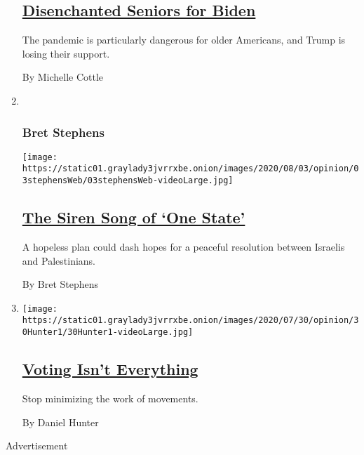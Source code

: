 \begin{enumerate}
  \hypertarget{disenchanted-seniors-for-biden}{%
  \subsection{\texorpdfstring{\href{/2020/08/03/opinion/senior-voters-biden-trump-2020.html}{Disenchanted
  Seniors for
  Biden}}{Disenchanted Seniors for Biden}}\label{disenchanted-seniors-for-biden}}

  The pandemic is particularly dangerous for older Americans, and Trump
  is losing their support.

  By Michelle Cottle
\item ~
  \hypertarget{bret-stephens}{%
  \subsubsection{Bret Stephens}\label{bret-stephens}}

  \texttt{[image: https://static01.graylady3jvrrxbe.onion/images/2020/08/03/opinion/03stephensWeb/03stephensWeb-videoLarge.jpg]}

  \hypertarget{the-siren-song-of-one-state}{%
  \subsection{\texorpdfstring{\href{/2020/08/03/opinion/israel-palestine-one-state-solution.html}{The
  Siren Song of `One
  State'}}{The Siren Song of `One State'}}\label{the-siren-song-of-one-state}}

  A hopeless plan could dash hopes for a peaceful resolution between
  Israelis and Palestinians.

  By Bret Stephens
\item
  \texttt{[image: https://static01.graylady3jvrrxbe.onion/images/2020/07/30/opinion/30Hunter1/30Hunter1-videoLarge.jpg]}

  \hypertarget{voting-isnt-everything}{%
  \subsection{\texorpdfstring{\href{/2020/08/04/opinion/voting-2020-election-blm-movement.html}{Voting
  Isn't
  Everything}}{Voting Isn't Everything}}\label{voting-isnt-everything}}

  Stop minimizing the work of movements.

  By Daniel Hunter
\end{enumerate}

Advertisement

